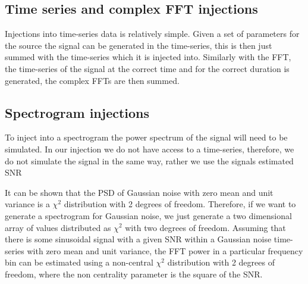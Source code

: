 \subsection{Time series and complex \ac{FFT} injections}
Injections into time-series data is relatively simple. Given a set of parameters for the source the signal can be generated in the time-series, this is then just summed with the time-series which it is injected into. Similarly with the \ac{FFT}, the time-series of the signal at the correct time and for the correct duration is generated, the complex \acp{FFT} are then summed.

\subsection{Spectrogram injections}

To inject into a spectrogram the power spectrum of the signal will need to be simulated. In our injection we do not have access to a time-series, therefore, we do not simulate the signal in the same way, rather we use the signals estimated \ac{SNR}

It can be shown that the \ac{PSD} of Gaussian noise with zero mean and unit variance is a $\chi^2$ distribution with 2 degrees of freedom. Therefore, if we want to generate a spectrogram for Gaussian noise, we just generate a two dimensional array of values distributed as $\chi^2$ with two degrees of freedom.
Assuming that there is some sinusoidal signal with a given \ac{SNR} within a Gaussian noise time-series with zero mean and unit variance, the \ac{FFT} power in a particular frequency bin can be estimated using a non-central $\chi^2$ distribution with 2 degrees of freedom, where the non centrality parameter is the square of the \ac{SNR}. 

